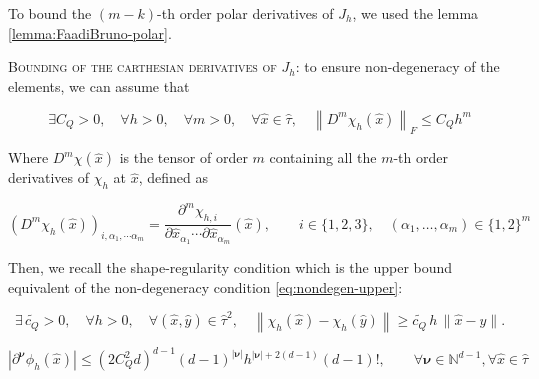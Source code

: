 ﻿\documentclass{article}
\begin{document}
To bound the $(m-k)$-th order polar derivatives of $J_h$, we used the lemma \ref{lemma:FaadiBruno-polar}.

\textsc{Bounding of the carthesian derivatives of $J_h$}: to ensure non-degeneracy of the elements, we can assume that

\begin{equation}\label{eq:nondegen-upper}
  \exists C_Q > 0, \quad \forall h > 0, \quad \forall m>0, \quad \forall \hat x \in \hat\tau, \quad \left\|D^{m}\chi_h(\hat x)\right\|_F \leq C_Q h^{m}
\end{equation}

Where $D^{m}\chi(\hat x)$ is the tensor of order $m$ containing all the $m$-th order derivatives of $\chi_h$ at $\hat x$, defined as

\begin{equation}
  \left(D^{m}\chi_h(\hat x)\right)_{i, \alpha_1, \cdots \alpha_m} = \frac{\partial^m \chi_{h, i}}{\partial \hat x_{\alpha_1}\cdots\partial \hat x_{\alpha_m}}(\hat x), \qquad i\in\{1, 2, 3\}, \quad (\alpha_1, \dots, \alpha_m)\in\{1, 2\}^m
\end{equation}

Then, we recall the shape-regularity condition which is the upper bound equivalent of the non-degeneracy condition \ref{eq:nondegen-upper}:

\begin{equation}\label{eq:nondegen-lower}
  \exists\,\widetilde{c_Q} > 0, \quad \forall h > 0, \quad \forall (\hat x, \hat y)\in\hat\tau^2, \quad \left\|\chi_h(\hat x) - \chi_h(\hat y)\right\| \geq \widetilde{c_Q}\, h\, \|\hat x - \hat y\|.
\end{equation}

\begin{lemma}\label{lemma:phi-derivatives}
  \begin{equation}
    |\partial^{\bm\nu}\phi_h(\hat x)| \leq (2C_Q^2d)^{d-1}(d-1)^{|\bm\nu|}h^{|\bm\nu|+2(d-1)}(d-1)!, \qquad \forall \bm\nu\in\mathbb N^{d-1}, \forall \hat x\in\hat\tau
  \end{equation}
\end{lemma}
\end{document}
